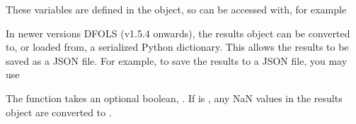 \documentclass[letterpaper,10pt,english]{sphinxmanual}
\begin{document}
\sphinxAtStartPar
These variables are defined in the  object, so can be accessed with, for example
\begin{quote}

\begin{sphinxVerbatim}[commandchars=\\\{\}]
   
\end{sphinxVerbatim}
\end{quote}

\sphinxAtStartPar
In newer versions DFO\sphinxhyphen{}LS (v1.5.4 onwards), the results object can be converted to, or loaded from, a serialized Python dictionary. This allows the results to be saved as a JSON file.
For example, to save the results to a JSON file, you may use
\begin{quote}

\begin{sphinxVerbatim}[commandchars=\\\{\}]
    
    
      
\end{sphinxVerbatim}
\end{quote}

\sphinxAtStartPar
The  function takes an optional boolean, . If  is , any NaN values in the results object are converted to .
\end{document}
